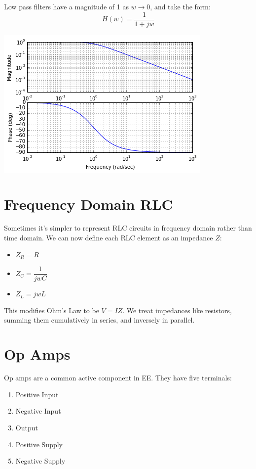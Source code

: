 \documentclass[12pt]{article}
\begin{document}
Low pass filters have a magnitude of 1 as $w \rightarrow 0$, and take the form:
\[H(w) = \dfrac{1}{1+jw}\]
\begin{center}
	\includegraphics[scale=0.75]{assets/ece210-lpf.png}
\end{center}


\section*{Frequency Domain RLC}
Sometimes it's simpler to represent RLC circuits in frequency domain rather than time domain. We can now define each RLC element as an impedance $Z$:
\begin{itemize}
	\item $Z_R = R$
	\item $Z_C = \dfrac{1}{jwC}$
	\item $Z_L = jwL$
\end{itemize}

This modifies Ohm's Law to be $V = I Z$. We treat impedances like resistors, summing them cumulatively in series, and inversely in parallel. 


\section*{Op Amps}
Op amps are a common active component in EE. They have five terminals:
\begin{enumerate}
	\item Positive Input
	\item Negative Input
	\item Output
	\item Positive Supply
	\item Negative Supply
\end{enumerate}
\end{document}

